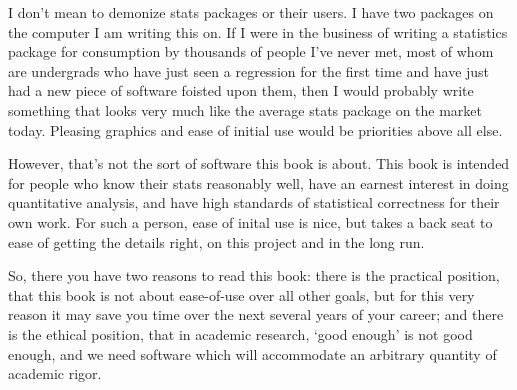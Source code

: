 {I don't mean to demonize stats packages or their users. I have two
packages on the computer I am writing this on. If I
were in the business of writing a statistics package for consumption by
thousands of people I've never met, most of whom are undergrads who have
just seen a regression for the first time and have just had a new piece
of software foisted upon them, then I would probably write something
that looks very much like the average stats package on the market today.
Pleasing graphics and ease of initial use would be priorities above all else.

However, that's not the sort of software this book is about.
This book is intended for people who know their stats reasonably well,
have an earnest interest in doing quantitative analysis, and have
high standards of statistical correctness for their own work. For such a
person, ease of inital use is nice, but takes a back seat to ease of
getting the details right, on this project and in the long run.

So, there you have two reasons to read this book: there is the practical
position, that this book is not about ease-of-use over all other goals,
but for this very reason it may save you time over the next several
years of your career; and there is the ethical position, that in academic
research, `good enough' is not good enough, and we need software which
will accommodate an arbitrary quantity of academic rigor.
}
